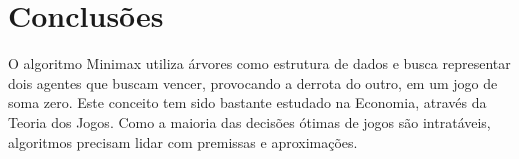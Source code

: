 \documentclass[sigplan,screen]{acmart}
\begin{document}
\section{Conclusões}
O algoritmo Minimax utiliza árvores como estrutura de dados e busca representar dois agentes que buscam vencer, provocando a derrota do outro, em um jogo de soma zero. 
Este conceito tem sido bastante estudado na Economia, através da Teoria dos Jogos. Como a maioria das decisões ótimas de jogos são intratáveis, algoritmos precisam lidar com premissas e aproximações.



\end{document}

